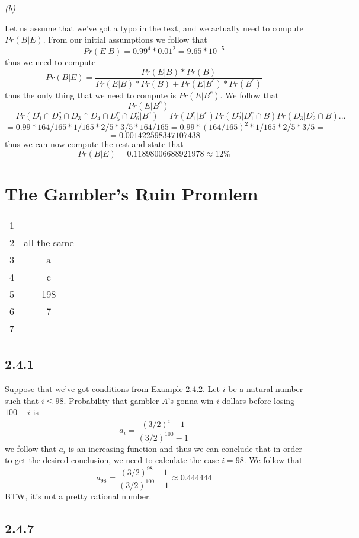 \documentclass[11pt,oneside,titlepage]{book}
\begin{document}
\textit{(b)}

Let us assume that we've got a typo in the text, and we actually need to compute $Pr(B|E)$.
From our initial assumptions we follow that
$$Pr(E|B) = 0.99^4 * 0.01^2 = 9.65 * 10^{-5}$$
thus we need to compute
$$Pr(B|E) = \frac{Pr(E|B) * Pr(B)}{Pr(E|B) * Pr(B) + Pr(E|B^c) * Pr(B^c)}$$
thus the only thing that we need to compute is $Pr(E|B^c)$.
We follow that
$$Pr(E | B^c) = $$
$$ = Pr(D_1^c \cap D_2^c \cap D_3 \cap D_4 \cap D_5^c \cap D_6^c | B^c) =
Pr(D_1^c|B^c) Pr(D_2^c |D_1^c \cap B) Pr(D_3| D_2^c \cap B) ...  = $$
$$ = 0.99 * 164/165 * 1/165 * 2/5 * 3/5 * 164/165 = 0.99 * (164/165)^2 * 1/165 * 2/5 * 3/5  = $$
$$ =  0.001422598347107438$$
thus we can now compute the rest and state that
$$Pr(B|E) = 0.11898006688921978 \approx 12\%$$

\section{The Gambler's Ruin Promlem}

\begin{tabular}[center]{||c | c|| }
  \hline
  1 & - \\
  2 & all the same \\
  3 & a \\
  4 & c \\
  5 & 198 \\
  6 & 7 \\
  7 & - \\
  \hline 
\end{tabular}

\subsection*{2.4.1}

Suppose that we've got conditions from Example 2.4.2. Let $i$ be a natural number such that
$i \leq 98$. Probability that gambler $A$'s gonna win $i$ dollars before losing $100 - i$ is
$$a_i = \frac{(3/2)^i - 1}{(3/2)^{100} - 1}$$
we follow that $a_i$ is an increasing function and thus we can conclude that in order to
get the desired conclusion, we need to calculate the case $i = 98$. We follow that
$$a_{98} = \frac{(3/2)^{98} - 1}{(3/2)^{100} - 1} \approx 0.444444$$
BTW, it's not a pretty rational number.

\subsection*{2.4.7}
\end{document}

